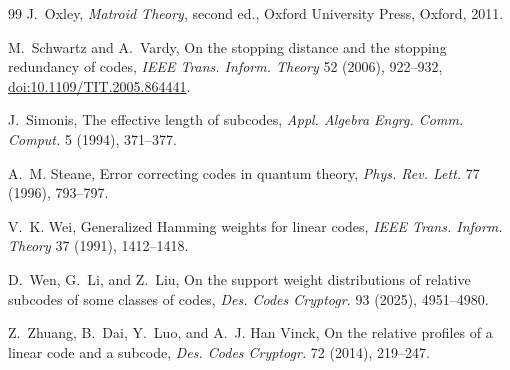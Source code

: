 \documentclass[11pt,letterpaper]{article}
\theoremstyle{plain}
\theoremstyle{definition}
\newcommand{\1}{\mathbf{1}}
\begin{document}
\begin{thebibliography}{99}
J.~Oxley,
\newblock \emph{Matroid Theory}, second ed.,
\newblock Oxford University Press, Oxford, 2011.

M.~Schwartz and A.~Vardy,
\newblock On the stopping distance and the stopping redundancy of codes,
\newblock \emph{IEEE Trans. Inform. Theory} 52 (2006), 922--932,
\newblock \href{https://doi.org/10.1109/TIT.2005.864441}{doi:10.1109/TIT.2005.864441}.

J.~Simonis,
\newblock The effective length of subcodes,
\newblock \emph{Appl. Algebra Engrg. Comm. Comput.} 5 (1994), 371--377.

A.~M. Steane,
\newblock Error correcting codes in quantum theory,
\newblock \emph{Phys. Rev. Lett.} 77 (1996), 793--797.

V.~K. Wei,
\newblock Generalized Hamming weights for linear codes,
\newblock \emph{IEEE Trans. Inform. Theory} 37 (1991), 1412--1418.

D.~Wen, G.~Li, and Z.~Liu,
\newblock On the support weight distributions of relative subcodes of some classes of
codes,
\newblock \emph{Des. Codes Cryptogr.} 93 (2025), 4951--4980.

Z.~Zhuang, B.~Dai, Y.~Luo, and A.~J. Han Vinck,
\newblock On the relative profiles of a linear code and a subcode,
\newblock \emph{Des. Codes Cryptogr.} 72 (2014), 219--247.

\end{thebibliography}
\end{document}

